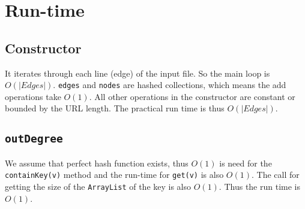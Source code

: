 \documentclass[10pt,letterpaper]{article}
\begin{document}
\section{Run-time}
\subsection{Constructor}
It iterates through each line (edge) of the input file. So the main loop is $O(|Edges|)$. \texttt{edges} and \texttt{nodes} are hashed collections, which means the add operations take $O(1)$. All other operations in the constructor are constant or bounded by the URL length. The practical run time is thus $O(|Edges|)$.
\subsection{\texttt{outDegree}}
We assume that perfect hash function exists, thus $O(1)$ is need for the \texttt{containKey(v)} method and the run-time for \texttt{get(v)} is also $O(1)$. The call for getting the size of the \texttt{ArrayList} of the key is also $O(1)$.
Thus the run time is $O(1)$.
\end{document}
